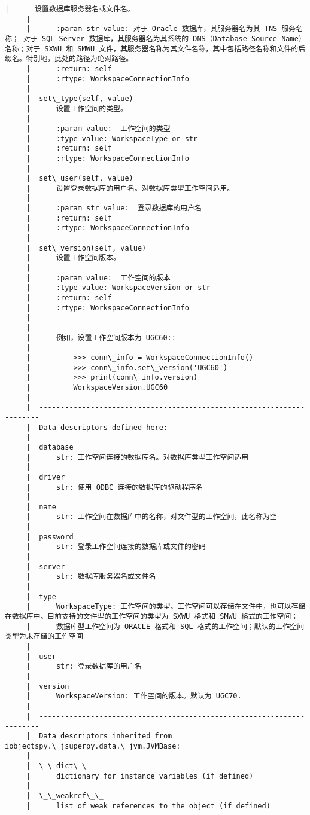 \documentclass[11pt]{article}
\begin{document}
\begin{Verbatim}[commandchars=\\\{\}]
     |      设置数据库服务器名或文件名。
     |      
     |      :param str value: 对于 Oracle 数据库，其服务器名为其 TNS 服务名称； 对于 SQL Server 数据库，其服务器名为其系统的 DNS（Database Source Name）名称；对于 SXWU 和 SMWU 文件，其服务器名称为其文件名称，其中包括路径名称和文件的后缀名。特别地，此处的路径为绝对路径。
     |      :return: self
     |      :rtype: WorkspaceConnectionInfo
     |  
     |  set\_type(self, value)
     |      设置工作空间的类型。
     |      
     |      :param value:  工作空间的类型
     |      :type value: WorkspaceType or str
     |      :return: self
     |      :rtype: WorkspaceConnectionInfo
     |  
     |  set\_user(self, value)
     |      设置登录数据库的用户名。对数据库类型工作空间适用。
     |      
     |      :param str value:  登录数据库的用户名
     |      :return: self
     |      :rtype: WorkspaceConnectionInfo
     |  
     |  set\_version(self, value)
     |      设置工作空间版本。
     |      
     |      :param value:  工作空间的版本
     |      :type value: WorkspaceVersion or str
     |      :return: self
     |      :rtype: WorkspaceConnectionInfo
     |      
     |      
     |      例如，设置工作空间版本为 UGC60::
     |      
     |          >>> conn\_info = WorkspaceConnectionInfo()
     |          >>> conn\_info.set\_version('UGC60')
     |          >>> print(conn\_info.version)
     |          WorkspaceVersion.UGC60
     |  
     |  ----------------------------------------------------------------------
     |  Data descriptors defined here:
     |  
     |  database
     |      str: 工作空间连接的数据库名。对数据库类型工作空间适用
     |  
     |  driver
     |      str: 使用 ODBC 连接的数据库的驱动程序名
     |  
     |  name
     |      str: 工作空间在数据库中的名称，对文件型的工作空间，此名称为空
     |  
     |  password
     |      str: 登录工作空间连接的数据库或文件的密码
     |  
     |  server
     |      str: 数据库服务器名或文件名
     |  
     |  type
     |      WorkspaceType: 工作空间的类型。工作空间可以存储在文件中，也可以存储在数据库中。目前支持的文件型的工作空间的类型为 SXWU 格式和 SMWU 格式的工作空间；
     |      数据库型工作空间为 ORACLE 格式和 SQL 格式的工作空间；默认的工作空间类型为未存储的工作空间
     |  
     |  user
     |      str: 登录数据库的用户名
     |  
     |  version
     |      WorkspaceVersion: 工作空间的版本。默认为 UGC70.
     |  
     |  ----------------------------------------------------------------------
     |  Data descriptors inherited from iobjectspy.\_jsuperpy.data.\_jvm.JVMBase:
     |  
     |  \_\_dict\_\_
     |      dictionary for instance variables (if defined)
     |  
     |  \_\_weakref\_\_
     |      list of weak references to the object (if defined)


\end{Verbatim}
\end{document}

